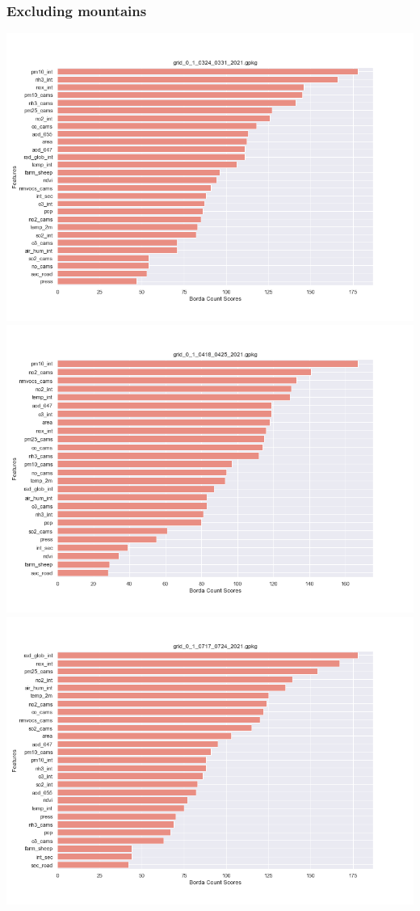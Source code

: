 \subsubsection{Excluding mountains}
\begin{center}
\includegraphics[width=.9\textwidth]{images/fs_results/pm25/01/no_montains/grid_0_1_0324_0331_2021.png}
\includegraphics[width=.9\textwidth]{images/fs_results/pm25/01/no_montains/grid_0_1_0418_0425_2021.png}
\includegraphics[width=.9\textwidth]{images/fs_results/pm25/01/no_montains/grid_0_1_0717_0724_2021.png}

\end{center}

